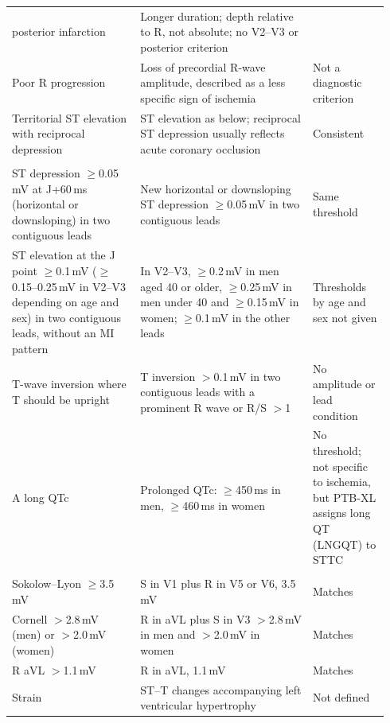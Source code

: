 \begin{table}[!htbp]
\begin{tabular}{L{0.32\linewidth}L{0.43\linewidth}L{0.19\linewidth}}
      posterior infarction~\citep{thygesen2018fourth} & Longer duration; depth relative to R, not absolute; no V2--V3 or
      posterior criterion \\
    Poor R progression & Loss of precordial R-wave amplitude, described as a less specific sign of
      ischemia~\citep{thygesen2018fourth} & Not a diagnostic criterion \\
    Territorial ST elevation with reciprocal depression & ST elevation as below; reciprocal ST depression usually
      reflects acute coronary occlusion~\citep{thygesen2018fourth} & Consistent \\
    \addlinespace[1pt]
     \\
    ST depression $\geq$0.05\,mV at J+60\,ms (horizontal or downsloping) in two contiguous leads & New horizontal or
      downsloping ST depression $\geq$0.05\,mV in two contiguous leads~\citep{thygesen2018fourth} & Same threshold \\
    ST elevation at the J point $\geq$0.1\,mV ($\geq$0.15--0.25\,mV in V2--V3 depending on age and sex) in two
      contiguous leads, without an MI pattern & In V2--V3, $\geq$0.2\,mV in men aged 40 or older, $\geq$0.25\,mV in men
      under 40 and $\geq$0.15\,mV in women; $\geq$0.1\,mV in the other
      leads~\citep{thygesen2018fourth,wagner2009recommendations} & Thresholds by age and sex not given \\
    T-wave inversion where T should be upright & T inversion $>$0.1\,mV in two contiguous leads with a prominent R wave
      or R/S $>$1~\citep{thygesen2018fourth} & No amplitude or lead condition \\
    A long QTc & Prolonged QTc: $\geq$450\,ms in men, $\geq$460\,ms in women~\citep{rautaharju2009recommendations} & No
      threshold; not specific to ischemia, but PTB-XL assigns long QT (LNGQT) to STTC~\citep{Wagner2020} \\
    \addlinespace[1pt]
     \\
    Sokolow--Lyon $\geq$3.5\,mV & S in V1 plus R in V5 or V6, 3.5\,mV~\citep{Sokolow1949} & Matches \\
    Cornell $>$2.8\,mV (men) or $>$2.0\,mV (women) & R in aVL plus S in V3 $>$2.8\,mV in men and $>$2.0\,mV in
      women~\citep{Casale1985} & Matches \\
    R aVL $>$1.1\,mV & R in aVL, 1.1\,mV~\citep{Sokolow1949,hancock2009recommendations} & Matches \\
    Strain & ST--T changes accompanying left ventricular hypertrophy~\citep{hancock2009recommendations} & Not defined \\

\end{tabular}
\end{table}
